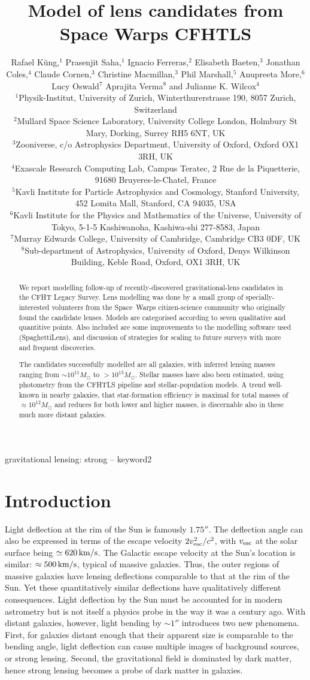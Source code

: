 \documentclass[fleqn,usenatbib]{mnras}
\title[Short title, max. 45 characters]{Model of lens candidates from
  Space Warps CFHTLS}
\author[K\"ung et al]{Rafael K\"ung,$^{1}$
Prasenjit Saha,$^{1}$
Ignacio Ferreras,$^{2}$
Elisabeth Baeten,$^{3}$
\newauthor
Jonathan Coles,$^{4}$
Claude Cornen,$^{3}$
Christine Macmillan,$^{3}$
Phil Marshall,$^{5}$ 
\newauthor
Anupreeta More,$^{6}$
Lucy Oswald$^{7}$
Aprajita Verma$^{8}$
and Julianne K. Wilcox$^{4}$
%
\\
%
$^{1}$Physik-Institut, University of Zurich, Winterthurerstrasse 190, 8057 Zurich, Switzerland\\
$^{2}$Mullard Space Science Laboratory, University College London, Holmbury St Mary, Dorking, Surrey RH5 6NT, UK\\
$^{3}$Zooniverse, c/o Astrophysics Department, University of Oxford, Oxford OX1 3RH, UK \\
$^{4}$Exascale Research Computing Lab, Campus Teratec, 2 Rue de la Piquetterie, 91680 Bruyeres-le-Chatel, France\\
$^{5}$Kavli Institute for Particle Astrophysics and Cosmology, Stanford University, 452 Lomita Mall, Stanford, CA 94035, USA\\
$^{6}$Kavli Institute for the Physics and Mathematics of the Universe, University of Tokyo, 5-1-5 Kashiwanoha, Kashiwa-shi 277-8583, Japan\\
$^{7}$Murray Edwards College, University of Cambridge, Cambridge CB3 0DF, UK\\
$^{8}$Sub-department of Astrophysics, University of Oxford, Denys Wilkinson Building, Keble Road, Oxford, OX1 3RH, UK\\
}
\begin{document}
\label{firstpage}
\pagerange{\pageref{firstpage}--\pageref{lastpage}}
\maketitle

\begin{abstract}
We report modelling follow-up of recently-discovered
gravitational-lens candidates in the CFHT Legacy Survey.  Lens
modelling was done by a small group of specially-interested volunteers
from the Space~Warps citizen-science community who originally found
the candidate lenses.  Models are categorised according to seven
qualitative and quantitive points.  Also included are some
improvements to the modelling software used (SpaghettiLens),
and discussion of strategies for scaling to future surveys
with more and frequent discoveries.

The candidates successfully modelled are all galaxies, with inferred
lensing masses ranging from $\sim10^{11}M_\odot$ to $>10^{13}M_\odot$.
Stellar masses have also been estimated, using photometry from the
CFHTLS pipeline and stellar-population models.  A trend well-known
in nearby galaxies, that star-formation efficiency is maximal for
total masses of $\approx10^{12}M_\odot$ and reduces for both lower and
higher masses, is discernable also in these much more distant
galaxies.
\end{abstract}

\begin{keywords}
gravitational lensing: strong -- keyword2
\end{keywords}

\section{Introduction}

Light deflection at the rim of the Sun is famously $1.75''$.  The
deflection angle can also be expressed in terms of the escape velocity
$2v_{\rm esc}^2/c^2$, with $v_{\rm esc}$ at the solar surface being
$\simeq620\rm\,km/s$.  The Galactic escape velocity at the Sun's
location is similar: $\approx500\rm\,km/s$, typical of massive
galaxies.  Thus, the outer regions of massive galaxies have lensing
deflections comparable to that at the rim of the Sun.  Yet these
quantitatively similar deflections have qualitatively different
consequences.  Light deflection by the Sun must be accounted for in
modern astrometry \citep[see e.g.,][]{2015CQGra..32p5008C} but is not
itself a physics probe in the way it was a century ago.  With distant
galaxies, however, light bending by $\sim1''$ introduces two new
phenomena.  First, for galaxies distant enough that their apparent
size is comparable to the bending angle, light deflection can cause
multiple images of background sources, or strong lensing.  Second, the
gravitational field is dominated by dark matter, hence strong lensing
becomes a probe of dark matter in galaxies.
\end{document}

